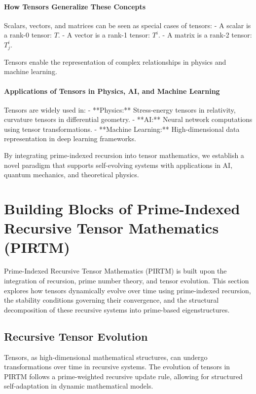 \documentclass{article}
\theoremstyle{plain}
\begin{document}
\paragraph{How Tensors Generalize These Concepts}
Scalars, vectors, and matrices can be seen as special cases of tensors:
- A scalar is a rank-0 tensor: \( T \).
- A vector is a rank-1 tensor: \( T^i \).
- A matrix is a rank-2 tensor: \( T^i_j \).

Tensors enable the representation of complex relationships in physics and machine learning.

\paragraph{Applications of Tensors in Physics, AI, and Machine Learning}
Tensors are widely used in:
- **Physics:** Stress-energy tensors in relativity, curvature tensors in differential geometry.
- **AI:** Neural network computations using tensor transformations.
- **Machine Learning:** High-dimensional data representation in deep learning frameworks.

By integrating prime-indexed recursion into tensor mathematics, we establish a novel paradigm that supports self-evolving systems with applications in AI, quantum mechanics, and theoretical physics.


\section{Building Blocks of Prime-Indexed Recursive Tensor Mathematics (PIRTM)}

Prime-Indexed Recursive Tensor Mathematics (PIRTM) is built upon the integration of recursion, prime number theory, and tensor evolution. This section explores how tensors dynamically evolve over time using prime-indexed recursion, the stability conditions governing their convergence, and the structural decomposition of these recursive systems into prime-based eigenstructures.

\subsection{Recursive Tensor Evolution}

Tensors, as high-dimensional mathematical structures, can undergo transformations over time in recursive systems. The evolution of tensors in PIRTM follows a prime-weighted recursive update rule, allowing for structured self-adaptation in dynamic mathematical models.
\end{document}
